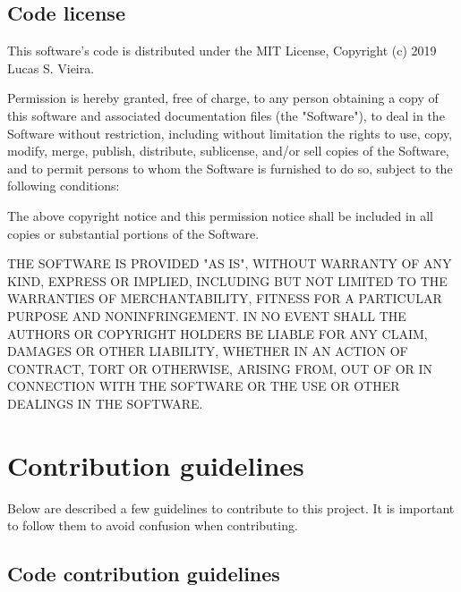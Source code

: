 \documentclass[openright,a4paper,twoside,12pt]{memoir}
\begin{document}
\subsection{Code license}
\label{sec:orgecd0d94}

This software's code is distributed under the MIT License, Copyright
(c) 2019 Lucas S. Vieira.

Permission is hereby granted, free of charge, to any person obtaining
a copy of this software and associated documentation files (the
"Software"), to deal in the Software without restriction, including
without limitation the rights to use, copy, modify, merge, publish,
distribute, sublicense, and/or sell copies of the Software, and to
permit persons to whom the Software is furnished to do so, subject
to the following conditions:

The above copyright notice and this permission notice shall be
included in all copies or substantial portions of the Software.

THE SOFTWARE IS PROVIDED "AS IS", WITHOUT WARRANTY OF ANY KIND,
EXPRESS OR IMPLIED, INCLUDING BUT NOT LIMITED TO THE WARRANTIES OF
MERCHANTABILITY, FITNESS FOR A PARTICULAR PURPOSE AND
NONINFRINGEMENT. IN NO EVENT SHALL THE AUTHORS OR COPYRIGHT HOLDERS
BE LIABLE FOR ANY CLAIM, DAMAGES OR OTHER LIABILITY, WHETHER IN AN
ACTION OF CONTRACT, TORT OR OTHERWISE, ARISING FROM, OUT OF OR IN
CONNECTION WITH THE SOFTWARE OR THE USE OR OTHER DEALINGS IN THE
SOFTWARE.

\section{Contribution guidelines}
\label{sec:orgeeca4a1}

Below are described a few guidelines to contribute to this project. It
is important to follow them to avoid confusion when contributing.

\subsection{Code contribution guidelines}
\label{sec:orgd499f56}
\end{document}
